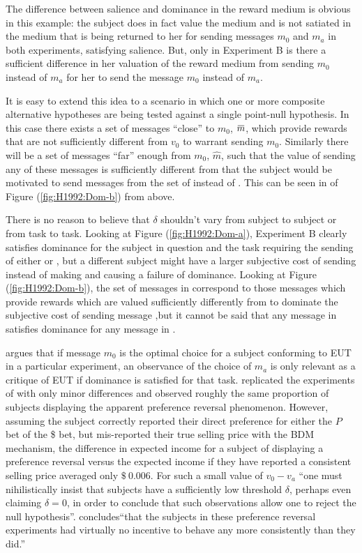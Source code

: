 \documentclass[11pt,a4paper]{report}
\newcommand{\money}[1]{$\$\!\:#1$}          %
\newcommand{\overbar}[1]{\mkern 1.5mu\overline{\mkern-1.5mu#1\mkern-1.5mu}\mkern 1.5mu} %
\begin{document}
The difference between salience and dominance in the reward medium is obvious in this example: the subject does in fact value the medium and is not satiated in the medium that is being returned to her for sending messages $m_0$ and $m_a$ in both experiments, satisfying salience.
But, only in Experiment B is there a sufficient difference in her valuation of the reward medium from sending $m_0$ instead of $m_a$ for her to send the message $m_0$ instead of $m_a$.

It is easy to extend this idea to a scenario in which one or more composite alternative hypotheses are being tested against a single point-null hypothesis.
In this case there exists a set of messages \enquote{close} to $m_0$, $\overbar{m}$, which provide rewards that are not sufficiently different from $v_0$ to warrant sending $m_0$.
Similarly there will be a set of messages \enquote{far} enough from $m_0$, $\hat{m}$, such that the value of sending any of these messages is sufficiently different from  that the subject would be motivated to send messages from the set of  instead of .
This can be seen in of Figure (\ref{fig:H1992:Dom-b}) from \textcite{Harrison1992} above.

There is no reason to believe that $\delta$ shouldn't vary from subject to subject or from task to task.
Looking at Figure (\ref{fig:H1992:Dom-a}), Experiment B clearly satisfies dominance for the subject in question and the task requiring the sending of either  or , but a different subject might have a larger subjective cost of sending  instead of  making  and causing a failure of dominance.
Looking at Figure (\ref{fig:H1992:Dom-b}), the set of messages in  correspond to those messages which provide rewards which are valued sufficiently differently from  to dominate the subjective cost of sending message ,but it cannot be said that any message in  satisfies dominance for any message in .


\textcite{Harrison1989} argues that if message $m_0$ is the optimal choice for a subject conforming to EUT in a particular experiment, an observance of the choice of $m_a$ is only relevant as a critique of EUT if dominance is satisfied for that task.
\textcite{Harrison1994} replicated the experiments of\textcite{Grether1979} with only minor differences and observed roughly the same proportion of subjects displaying the apparent preference reversal phenomenon.
However, assuming the subject correctly reported their direct preference for either the $P$ bet of the \$ bet, but mis-reported their true selling price with the BDM mechanism, the difference in expected income for a subject of displaying a preference reversal versus the expected income if they have reported a consistent selling price averaged only \money{0.006}. 
For such a small value of $v_0 - v_a$ \enquote{one must nihilistically insist that subjects have a sufficiently low threshold $\delta$, perhaps even claiming $\delta = 0$, in order to conclude that such observations allow one to reject the null hypothesis}\parencite[1428]{Harrison1992}.
\textcite[237]{Harrison1994} concludes\enquote{that the subjects in these preference reversal experiments had virtually no incentive to behave any more consistently than they did.}
\end{document}
